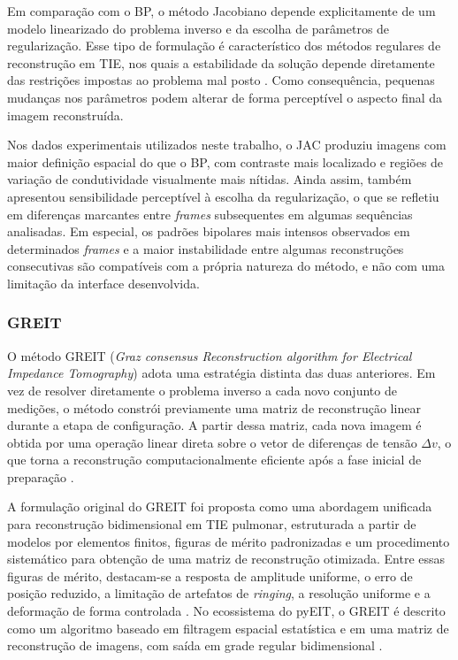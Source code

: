 Em comparação com o BP, o método Jacobiano depende explicitamente de um modelo linearizado do problema inverso e da escolha de parâmetros de regularização. Esse tipo de formulação é característico dos métodos regulares de reconstrução em TIE, nos quais a estabilidade da solução depende diretamente das restrições impostas ao problema mal posto \cite{AdlerHolder2021}. Como consequência, pequenas mudanças nos parâmetros podem alterar de forma perceptível o aspecto final da imagem reconstruída.

Nos dados experimentais utilizados neste trabalho, o JAC produziu imagens com maior definição espacial do que o BP, com contraste mais localizado e regiões de variação de condutividade visualmente mais nítidas. Ainda assim, também apresentou sensibilidade perceptível à escolha da regularização, o que se refletiu em diferenças marcantes entre \textit{frames} subsequentes em algumas sequências analisadas. Em especial, os padrões bipolares mais intensos observados em determinados \textit{frames} e a maior instabilidade entre algumas reconstruções consecutivas são compatíveis com a própria natureza do método, e não com uma limitação da interface desenvolvida.

\subsubsection{GREIT}
\label{subsubsec:greit}

O método GREIT (\textit{Graz consensus Reconstruction algorithm for Electrical Impedance Tomography}) adota uma estratégia distinta das duas anteriores. Em vez de resolver diretamente o problema inverso a cada novo conjunto de medições, o método constrói previamente uma matriz de reconstrução linear durante a etapa de configuração. A partir dessa matriz, cada nova imagem é obtida por uma operação linear direta sobre o vetor de diferenças de tensão \(\Delta v\), o que torna a reconstrução computacionalmente eficiente após a fase inicial de preparação \cite{GREIT2009}.

A formulação original do GREIT foi proposta como uma abordagem unificada para reconstrução bidimensional em TIE pulmonar, estruturada a partir de modelos por elementos finitos, figuras de mérito padronizadas e um procedimento sistemático para obtenção de uma matriz de reconstrução otimizada. Entre essas figuras de mérito, destacam-se a resposta de amplitude uniforme, o erro de posição reduzido, a limitação de artefatos de \textit{ringing}, a resolução uniforme e a deformação de forma controlada \cite{GREIT2009}. No ecossistema do pyEIT, o GREIT é descrito como um algoritmo baseado em filtragem espacial estatística e em uma matriz de reconstrução de imagens, com saída em grade regular bidimensional \cite{pyEITReadme}.

